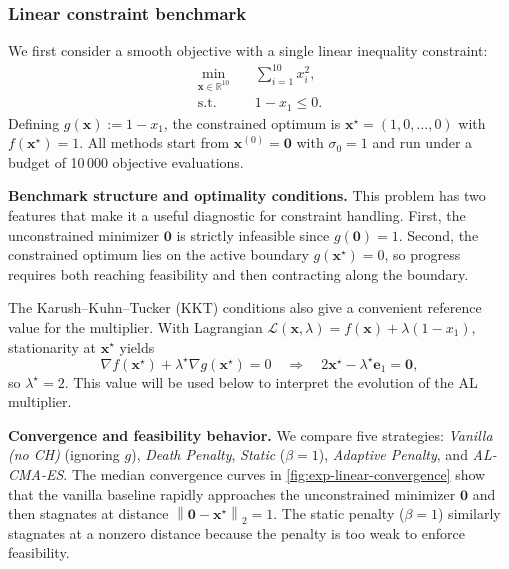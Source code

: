 \documentclass[11pt,a4paper]{article}
\numberwithin{equation}{section}
\numberwithin{figure}{section}
\numberwithin{table}{section}
\theoremstyle{definition}
\newcommand{\R}{\mathbb{R}}
\newcommand{\norm}[1]{\left\lVert #1 \right\rVert}
\begin{document}
\subsubsection{Linear constraint benchmark}\label{subsubsec:exp-linear}
We first consider a smooth objective with a single linear inequality constraint:
\begin{equation}
\label{eq:baseline-sphere}
  \begin{aligned}
    \min_{\bm{x}\in\R^{10}}\quad & \sum_{i=1}^{10} x_i^2,\\
    \text{s.t.}\quad & 1-x_1 \le 0.
  \end{aligned}
\end{equation}
Defining $g(\bm{x}) := 1-x_1$, the constrained optimum is $\bm{x}^\star=(1,0,\dots,0)$ with $f(\bm{x}^\star)=1$. All methods start from $\bm{x}^{(0)}=\bm{0}$ with $\sigma_0=1$ and run under a budget of 10\,000 objective evaluations.

\textbf{Benchmark structure and optimality conditions.}
This problem has two features that make it a useful diagnostic for constraint handling. First, the unconstrained minimizer $\bm{0}$ is strictly infeasible since $g(\bm{0})=1$. Second, the constrained optimum lies on the active boundary $g(\bm{x}^\star)=0$, so progress requires both reaching feasibility and then contracting along the boundary.

The Karush--Kuhn--Tucker (KKT) conditions also give a convenient reference value for the multiplier. With Lagrangian
\(
  \mathcal{L}(\bm{x},\lambda)= f(\bm{x}) + \lambda(1-x_1),
\)
stationarity at $\bm{x}^\star$ yields
\begin{equation}
  \nabla f(\bm{x}^\star) + \lambda^\star \nabla g(\bm{x}^\star) = 0
  \quad\Longrightarrow\quad
  2\bm{x}^\star - \lambda^\star \bm{e}_1 = \bm{0},
\end{equation}
so $\lambda^\star=2$. This value will be used below to interpret the evolution of the AL multiplier.

\textbf{Convergence and feasibility behavior.}
We compare five strategies: \emph{Vanilla (no CH)} (ignoring $g$), \emph{Death Penalty}, \emph{Static} ($\beta=1$), \emph{Adaptive Penalty}, and \emph{AL-CMA-ES}.\cite{DufosseHansen,Atamna2016} The median convergence curves in \cref{fig:exp-linear-convergence} show that the vanilla baseline rapidly approaches the unconstrained minimizer $\bm{0}$ and then stagnates at distance $\norm{\bm{0}-\bm{x}^\star}_2=1$. The static penalty ($\beta=1$) similarly stagnates at a nonzero distance because the penalty is too weak to enforce feasibility.
\end{document}
